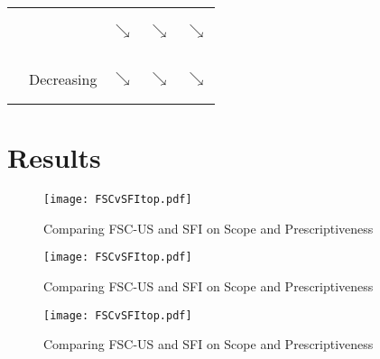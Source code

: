 \begin{frame}
\begin{table}[h!]
\begin{tabular}{cllll}
\multicolumn{1}{c}{} & \multicolumn{1}{c|}{} & \multicolumn{1}{c|}{$\searrow$}           & \multicolumn{1}{c|}{$\searrow$}       & \multicolumn{1}{c|}{\begin{rotate}{30}$\searrow$\end{rotate}}          \\ 
\multicolumn{1}{c}{} & \multicolumn{1}{c|}{Decreasing} & \multicolumn{1}{c|}{\begin{rotate}{30}$\searrow$\end{rotate}}           & \multicolumn{1}{c|}{$\searrow$}       & \multicolumn{1}{c|}{$\searrow$}          \\ \cline{3-5} 
\end{tabular}
\end{table}
\end{frame}





\section{Results}
\begin{frame}
\begin{figure}[h!]
\centering
\label{sfi}
\caption{Comparing FSC-US and SFI on Scope and Prescriptiveness}
\texttt{[image: FSCvSFItop.pdf]}
\end{figure}
\end{frame}

\begin{frame}
\begin{figure}[h!]
\centering
\label{sfi}
\caption{Comparing FSC-US and SFI on Scope and Prescriptiveness}
\texttt{[image: FSCvSFItop.pdf]}
\end{figure}
\end{frame}


\begin{frame}
\begin{figure}[h!]
\centering
\label{sfi}
\caption{Comparing FSC-US and SFI on Scope and Prescriptiveness}
\texttt{[image: FSCvSFItop.pdf]}
\end{figure}
\end{frame}


